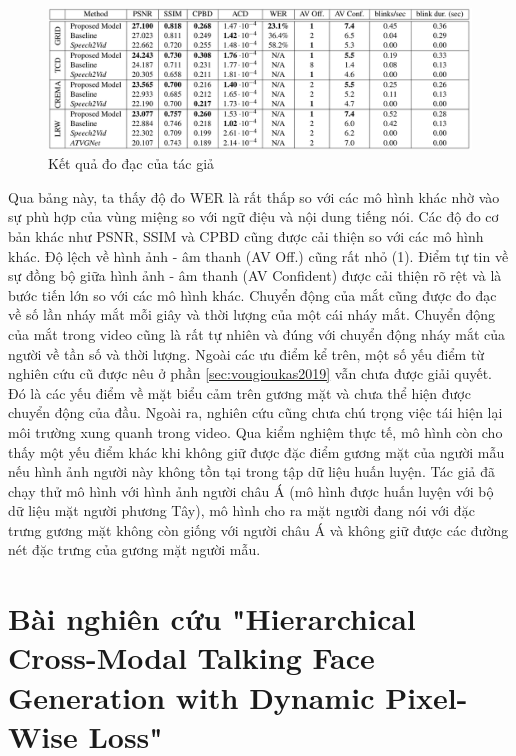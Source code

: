 \begin{figure}[H]
    \centering
    \includegraphics[width=15cm]{./content/images/vou2020_result.png}
    \caption{Kết quả đo đạc của tác giả}
    \label{fig:vou2020_result}
\end{figure}

Qua bảng này, ta thấy độ đo WER là rất thấp so với các mô hình khác nhờ vào sự phù hợp của vùng miệng so với ngữ điệu và nội dung tiếng nói. Các độ đo cơ bản khác như PSNR, SSIM và CPBD cũng được cải thiện so với các mô hình khác. Độ lệch về hình ảnh - âm thanh (AV Off.) cũng rất nhỏ (1). Điểm tự tin về sự đồng bộ giữa hình ảnh - âm thanh (AV Confident) được cải thiện rõ rệt và là bước tiến lớn so với các mô hình khác. Chuyển động của mắt cũng được đo đạc về số lần nháy mắt mỗi giây và thời lượng của một cái nháy mắt. Chuyển động của mắt trong video cũng là rất tự nhiên và đúng với chuyển động nháy mắt của người về tần số và thời lượng.
Ngoài các ưu điểm kể trên, một số yếu điểm từ nghiên cứu cũ được nêu ở phần \ref{sec:vougioukas2019} vẫn chưa được giải quyết. Đó là các yếu điểm về mặt biểu cảm trên gương mặt và chưa thể hiện được chuyển động của đầu. Ngoài ra, nghiên cứu cũng chưa chú trọng việc tái hiện lại môi trường xung quanh trong video. Qua kiểm nghiệm thực tế, mô hình còn cho thấy một yếu điểm khác khi không giữ được đặc điểm gương mặt của người mẫu nếu hình ảnh người này không tồn tại trong tập dữ liệu huấn luyện. Tác giả đã chạy thử mô hình với hình ảnh người châu Á (mô hình được huấn luyện với bộ dữ liệu mặt người phương Tây), mô hình cho ra mặt người đang nói với đặc trưng gương mặt không còn giống với người châu Á và không giữ được các đường nét đặc trưng của gương mặt người mẫu.


\section{Bài nghiên cứu "Hierarchical Cross-Modal Talking Face Generation with Dynamic Pixel-Wise Loss"\cite{chen2019}}


